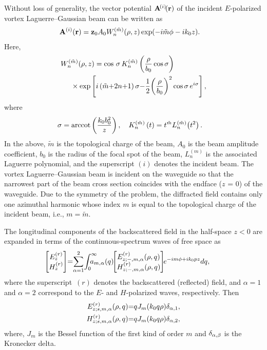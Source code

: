 \documentclass[conference,a4paper]{IEEEtran}
\begin{document}
Without loss of generality, the vector potential ${{\bf A}^{\!(i)}}\!({\bf r})$ of the incident $E$-polarized vortex Laguerre--Gaussian beam can be written as
\begin{align}
& {{\bf A}^{(i)}}({\bf r}) = {\bf z}_0 A_0 W_n^{(\tilde{m})}(\rho,z) \exp(-{i}\tilde{m}\phi-{i}k_0 z).\label{eq10}
\end{align}
Here,
\begin{align}
& W_n^{(\tilde{m})}(\rho,z) = \cos \,\sigma \,K_n^{(\tilde{m})}\left( {\frac{\rho}{b_0} \cos \sigma} \right)\notag\\
&\hspace{5mm}\times \exp \left[ {i\left( {\tilde{m} {+} 2n {+} 1} \right)\sigma  {-} \frac{1}{2}{\left(\frac{\rho}{b_0} \right)^2}\cos\sigma \,{e^{i\sigma }}} \right],\notag
\end{align}
where
\begin{align}
& \sigma  = {\rm arccot}\left( {\frac{{k_0{b_0^2}}}{z}} \right),\quad  K_n^{(\tilde{m})}\left( t \right) = {t^{\tilde{m}}}L_n^{(\tilde{m})}\!\left( {{t^2}} \right).\notag
\end{align}
In the above, $\tilde{m}$ is the topological charge of the beam, $A_0$ is the beam amplitude coefficient, $b_0$ is the radius of the focal spot of the beam, $L_n^{(m)}$ is the associated Laguerre polynomial, and the superscript $(i)$ denotes the incident beam. The vortex Laguerre--Gaussian beam is incident on the waveguide so that the narrowest part of the beam cross section coincides with the endface ($z$ = 0) of the waveguide. Due to the symmetry of the problem, the diffracted field contains only one azimuthal harmonic whose index $m$ is equal to the topological charge of the incident beam, i.e., $m=\tilde{m}$.

The longitudinal components of the backscattered field in the half-space $z<0$ are expanded in terms of the continuous-spectrum waves of free space as
\begin{align}\label{eq15}
&\hspace{-3mm}\left[\!\!\!
\begin{array}{c}
{E_z^{(r)}}\\
{H_z^{(r)}}
\end{array}\!\!\!\right]\!
{=}\!\sum\limits_{\alpha=1}^{2}\!\int_{0}^{\infty}\!\!\!\!\!\!\! a_{m,\alpha}(q)\!\!\left[\!\!\!
\begin{array}{c}
E^{(r)}_{z;-,m,\a}(\rho,q)\\
H^{(r)}_{z;-,m,\a}(\rho,q)
\end{array}\!\!\!\right]\!\!e^{-i m\f+ik_0 p z}{d}q,
\end{align}
where the superscript~$(r)$ denotes the backscattered (reflected) field, and $\alpha=1$ and $\alpha=2$ correspond to the $E$- and $H$-polarized waves, respectively. Then
\begin{align}\label{eq16}
E^{(r)}_{z;s,m,\alpha}(\rho,q) {=} q J_m(k_0q \rho)\delta_{\alpha,1},\nonumber\\ H^{(r)}_{z;s,m,\alpha}(\rho,q) {=} q J_m(k_0q \rho)\delta_{\alpha,2},
\end{align}
where, $J_m$ is the Bessel function of the first kind of order $m$ and $\delta_{\rm
	\alpha,\beta}$ is the Kronecker delta.
\end{document}
